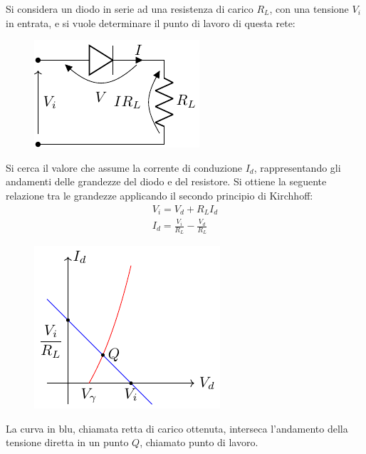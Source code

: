 \documentclass{article}
\numberwithin{equation}{subsection}
\begin{document}
Si considera un diodo in serie ad una resistenza di carico $R_L$, con una tensione $V_i$ in entrata, e si vuole determinare il punto di lavoro di questa 
rete:
\begin{figure}[H]%
    \centering
    \includegraphics{diodo-resistenza-serie.pdf}%
    \label{fig:diodo-resistenza-serie}
\end{figure}
Si cerca il valore che assume la corrente di conduzione $I_d$, rappresentando gli andamenti delle grandezze del diodo e del resistore. 
Si ottiene la seguente relazione tra le grandezze applicando il secondo principio di Kirchhoff:
\begin{gather*}
    V_i=V_d+R_LI_d\\
    I_d=\displaystyle\frac{V_i}{R_L}-\frac{V_d}{R_L}
\end{gather*}
\begin{figure}[H]%
    \centering
    \includegraphics{andamento-diodo-resistore-serie.pdf}%
    \label{fig:andamento-diodo-resistore-serie}
\end{figure}

La curva in blu, chiamata retta di carico ottenuta, interseca l'andamento della tensione diretta in un punto $Q$, chiamato punto di lavoro. 
\end{document}
